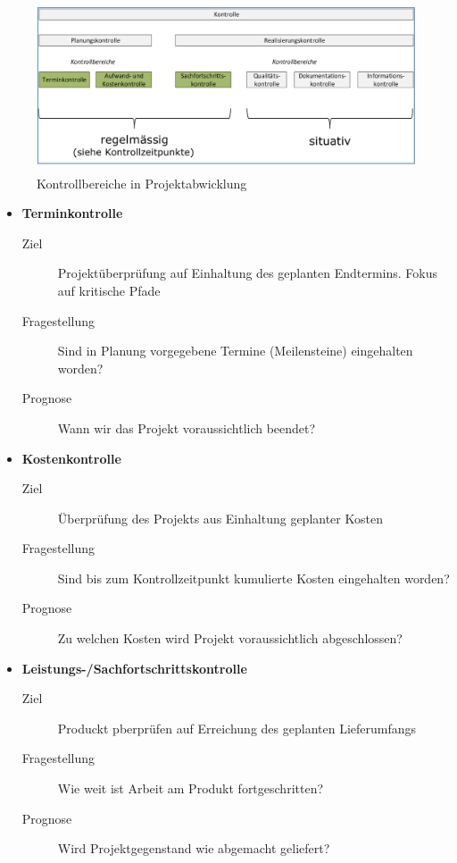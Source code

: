 \documentclass[a4paper]{article}
\begin{document}
		\begin{figure}[!htb]
			\centering
			\includegraphics[height=5cm]{img/pm/kontrollbereiche.png}
			\caption{Kontrollbereiche in Projektabwicklung}
			\label{fig:pm_kontrollbereiche}
		\end{figure}
	
		\begin{itemize}
			\item \textbf{Terminkontrolle}
				\begin{description}
					\item[Ziel] Projektüberprüfung auf Einhaltung des geplanten Endtermins. Fokus auf kritische Pfade
					\item[Fragestellung] Sind in Planung vorgegebene Termine (Meilensteine) eingehalten worden?
					\item[Prognose] Wann wir das Projekt voraussichtlich beendet?
				\end{description}
			\item \textbf{Kostenkontrolle}
				\begin{description}
					\item[Ziel] Überprüfung des Projekts aus Einhaltung geplanter Kosten
					\item[Fragestellung] Sind bis zum Kontrollzeitpunkt kumulierte Kosten eingehalten worden?
					\item[Prognose] Zu welchen Kosten wird Projekt voraussichtlich abgeschlossen?
				\end{description}
			\item \textbf{Leistungs-/Sachfortschrittskontrolle}
				\begin{description}
					\item[Ziel] Produckt pberprüfen auf Erreichung des geplanten Lieferumfangs
					\item[Fragestellung] Wie weit ist Arbeit am Produkt fortgeschritten?
					\item[Prognose] Wird Projektgegenstand wie abgemacht geliefert?
				\end{description}
		\end{itemize}
	
\end{document}
